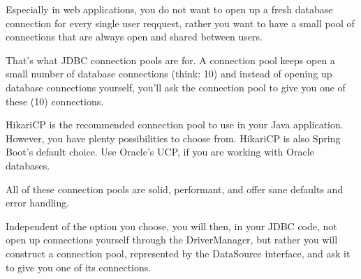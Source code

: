 Especially in web applications, you do not want to open up a fresh database connection for every single user reqquest, rather you want to have a small pool of connections that are always open and shared between users.

That’s what JDBC connection pools are for.  A connection pool keeps open a small number of database connections (think: 10) and instead of opening up database connections yourself, you’ll ask the connection pool to give you one of these (10) connections.



HikariCP is the recommended connection pool to use in your Java application. However, you have plenty possibilities to choose from.
HikariCP is also Spring Boot’s default choice. Use Oracle’s UCP, if you are working with Oracle databases.

All of these connection pools are  solid, performant, and offer sane defaults and error handling.

Independent of the option you choose, you will then, in your JDBC code, not open up connections yourself through the DriverManager, but rather you will construct a connection pool, represented by the DataSource interface, and ask it to give you one of its connections.



